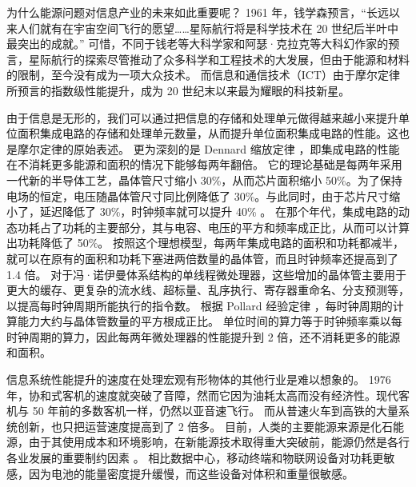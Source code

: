 为什么能源问题对信息产业的未来如此重要呢？
1961 年，钱学森预言，``长远以来人们就有在宇宙空间飞行的愿望……星际航行将是科学技术在 20 世纪后半叶中最突出的成就。'' \cite{qianxuesen}
可惜，不同于钱老等大科学家和阿瑟·克拉克等大科幻作家的预言，星际航行的探索尽管推动了众多科学和工程技术的大发展，但由于能源和材料的限制，至今没有成为一项大众技术。
而信息和通信技术（ICT）由于摩尔定律所预言的指数级性能提升，成为 20 世纪末以来最为耀眼的科技新星。

由于信息是无形的，我们可以通过把信息的存储和处理单元做得越来越小来提升单位面积集成电路的存储和处理单元数量，从而提升单位面积集成电路的性能。这也是摩尔定律的原始表述。
更为深刻的是 Dennard 缩放定律 \cite{dennard1974design}，即集成电路的性能在不消耗更多能源和面积的情况下能够每两年翻倍。
它的理论基础是每两年采用一代新的半导体工艺，晶体管尺寸缩小 30\%，从而芯片面积缩小 50\%。为了保持电场的恒定，电压随晶体管尺寸同比例降低了 30\%。与此同时，由于芯片尺寸缩小了，延迟降低了 30\%，时钟频率就可以提升 40\% \cite{borkar1999design,borkar2011future}。
在那个年代，集成电路的动态功耗占了功耗的主要部分，其与电容、电压的平方和频率成正比，从而可以计算出功耗降低了 50\%。
按照这个理想模型，每两年集成电路的面积和功耗都减半，就可以在原有的面积和功耗下塞进两倍数量的晶体管，而且时钟频率还提高到了 1.4 倍。
对于冯·诺伊曼体系结构的单线程微处理器，这些增加的晶体管主要用于更大的缓存、更复杂的流水线、超标量、乱序执行、寄存器重命名、分支预测等，以提高每时钟周期所能执行的指令数。
根据 Pollard 经验定律 \cite{pollackpollack}，每时钟周期的计算能力大约与晶体管数量的平方根成正比。
单位时间的算力等于时钟频率乘以每时钟周期的算力，因此每两年微处理器的性能提升到 2 倍，还不消耗更多的能源和面积。

信息系统性能提升的速度在处理宏观有形物体的其他行业是难以想象的。
1976 年，协和式客机的速度就突破了音障，然而它因为油耗太高而没有经济性。现代客机与 50 年前的多数客机一样，仍然以亚音速飞行。
而从普速火车到高铁的大量系统创新，也只把运营速度提高到了 2 倍多。
目前，人类的主要能源来源是化石能源，由于其使用成本和环境影响，在新能源技术取得重大突破前，能源仍然是各行各业发展的重要制约因素 \cite{energy}。
相比数据中心，移动终端和物联网设备对功耗更敏感，因为电池的能量密度提升缓慢，而这些设备对体积和重量很敏感。

